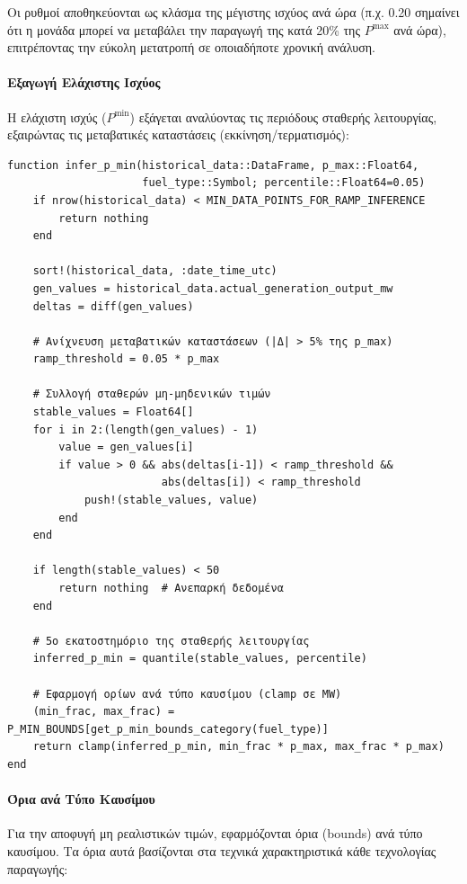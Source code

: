 Οι ρυθμοί αποθηκεύονται ως κλάσμα της μέγιστης ισχύος ανά ώρα (π.χ. 0.20 σημαίνει ότι η μονάδα μπορεί να μεταβάλει την παραγωγή της κατά 20\% της $P^{\max}$ ανά ώρα), επιτρέποντας την εύκολη μετατροπή σε οποιαδήποτε χρονική ανάλυση.

\paragraph{Εξαγωγή Ελάχιστης Ισχύος}
Η ελάχιστη ισχύς ($P^{\min}$) εξάγεται αναλύοντας τις περιόδους σταθερής λειτουργίας, εξαιρώντας τις μεταβατικές καταστάσεις (εκκίνηση/τερματισμός):

\begin{samepage}
\begin{verbatim}
function infer_p_min(historical_data::DataFrame, p_max::Float64,
                     fuel_type::Symbol; percentile::Float64=0.05)
    if nrow(historical_data) < MIN_DATA_POINTS_FOR_RAMP_INFERENCE
        return nothing
    end

    sort!(historical_data, :date_time_utc)
    gen_values = historical_data.actual_generation_output_mw
    deltas = diff(gen_values)

    # Ανίχνευση μεταβατικών καταστάσεων (|Δ| > 5% της p_max)
    ramp_threshold = 0.05 * p_max

    # Συλλογή σταθερών μη-μηδενικών τιμών
    stable_values = Float64[]
    for i in 2:(length(gen_values) - 1)
        value = gen_values[i]
        if value > 0 && abs(deltas[i-1]) < ramp_threshold &&
                        abs(deltas[i]) < ramp_threshold
            push!(stable_values, value)
        end
    end

    if length(stable_values) < 50
        return nothing  # Ανεπαρκή δεδομένα
    end

    # 5ο εκατοστημόριο της σταθερής λειτουργίας
    inferred_p_min = quantile(stable_values, percentile)

    # Εφαρμογή ορίων ανά τύπο καυσίμου (clamp σε MW)
    (min_frac, max_frac) = P_MIN_BOUNDS[get_p_min_bounds_category(fuel_type)]
    return clamp(inferred_p_min, min_frac * p_max, max_frac * p_max)
end
\end{verbatim}
\end{samepage}

\paragraph{Όρια ανά Τύπο Καυσίμου}
Για την αποφυγή μη ρεαλιστικών τιμών, εφαρμόζονται όρια (bounds) ανά τύπο καυσίμου. Τα όρια αυτά βασίζονται στα τεχνικά χαρακτηριστικά κάθε τεχνολογίας παραγωγής:

